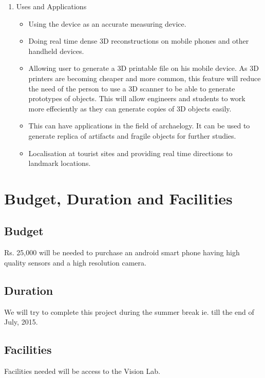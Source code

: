 \documentclass{article}
\begin{document}
\begin{enumerate}
			\item Uses and Applications
			\begin{itemize}
				\item Using the device as an accurate measuring device.
				\item Doing real time dense 3D reconstructions on mobile phones and other handheld devices. 
				\item Allowing user to generate a 3D printable file on his mobile device. As 3D printers are becoming cheaper and more common, this feature will reduce the need of the person to use a 3D scanner to be able to generate prototypes of objects. This will allow engineers and students to work more effeciently as they can generate copies of 3D objects easily.
				\item This can have applications in the field of archaelogy. It can be used to generate replica of artifacts and fragile objects for further studies.
				\item Localisation at tourist sites and providing real time directions to landmark locations. 
			\end{itemize}
		\end{enumerate}
	\section{Budget, Duration and Facilities}	
		\subsection{Budget}
			Rs. 25,000 will be needed to purchase an android smart phone having high quality sensors and a high resolution camera.
		\subsection{Duration}
			We will try to complete this project during the summer break ie. till the end of July, 2015. 
		\subsection{Facilities}
			Facilities needed will be access to the Vision Lab.
\end{document}
